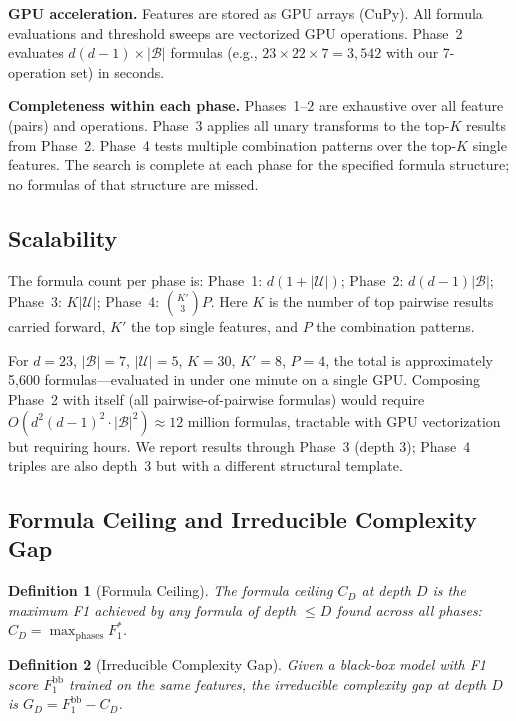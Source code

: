 \documentclass[journal]{IEEEtran}
\newtheorem{definition}{Definition}
\begin{document}
\textbf{GPU acceleration.} Features are stored as GPU arrays (CuPy).
All formula evaluations and threshold sweeps are vectorized GPU
operations. Phase~2 evaluates $d(d-1) \times |\mathcal{B}|$ formulas
(e.g., $23 \times 22 \times 7 = 3{,}542$ with our 7-operation set)
in seconds.

\textbf{Completeness within each phase.} Phases~1--2 are exhaustive
over all feature (pairs) and operations. Phase~3 applies all unary
transforms to the top-$K$ results from Phase~2. Phase~4 tests
multiple combination patterns over the top-$K$ single features.
The search is complete at each phase for the specified formula
structure; no formulas of that structure are missed.

\subsection{Scalability}

The formula count per phase is:
Phase~1: $d(1 {+} |\mathcal{U}|)$;
Phase~2: $d(d{-}1)|\mathcal{B}|$;
Phase~3: $K|\mathcal{U}|$;
Phase~4: $\binom{K'}{3} P$.
Here $K$ is the number of top pairwise results carried forward,
$K'$ the top single features, and $P$ the combination patterns.

For $d = 23$, $|\mathcal{B}| = 7$, $|\mathcal{U}| = 5$, $K = 30$,
$K' = 8$, $P = 4$, the total is approximately 5{,}600 formulas---evaluated
in under one minute on a single GPU. Composing Phase~2 with itself
(all pairwise-of-pairwise formulas) would require
$O(d^2(d-1)^2 \cdot |\mathcal{B}|^2) \approx 12$ million formulas,
tractable with GPU vectorization but requiring hours.
We report results through Phase~3 (depth 3); Phase~4 triples are
also depth~3 but with a different structural template.

\subsection{Formula Ceiling and Irreducible Complexity Gap}

\begin{definition}[Formula Ceiling]
The formula ceiling $C_D$ at depth $D$ is the maximum F1 achieved
by any formula of depth $\leq D$ found across all phases:
$C_D = \max_{\text{phases}} F_1^*$.
\end{definition}

\begin{definition}[Irreducible Complexity Gap]
Given a black-box model with F1 score $F_1^{\mathrm{bb}}$ trained on
the same features, the irreducible complexity gap at depth $D$ is
$G_D = F_1^{\mathrm{bb}} - C_D$.
\end{definition}
\end{document}
